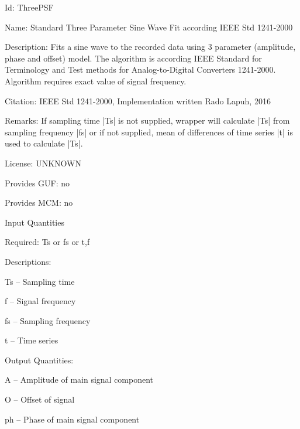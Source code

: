 \begin{tightdesc}
\item [Id:] ThreePSF
\item [Name:] Standard Three Parameter Sine Wave Fit according IEEE Std 1241-2000
\item [Description:] Fits a sine wave to the recorded data using 3 parameter (amplitude, phase and offset) model. The algorithm is according IEEE Standard for Terminology and Test methods for Analog-to-Digital Converters 1241-2000. Algorithm requires exact value of signal frequency.
\item [Citation:] IEEE Std 1241-2000, Implementation written Rado Lapuh, 2016
\item [Remarks:] If sampling time |Ts| is not supplied, wrapper will calculate |Ts| from sampling frequency |fs| or if not supplied, mean of differences of time series |t| is used to calculate |Ts|.
\item [License:] UNKNOWN
\item [Provides GUF:] no
\item [Provides MCM:] no
\item [Input Quantities] \rule{0em}{0em}
    \begin{tightdesc}
    \item [Required:] 
        \textsf{Ts} or \textsf{fs} or \textsf{t},\enspace \textsf{f}
    \item [Descriptions:] \rule{0em}{0em}
        \begin{tightdesc}
            \item[\textsf{Ts}] -- Sampling time
            \item[\textsf{f}] -- Signal frequency
            \item[\textsf{fs}] -- Sampling frequency
            \item[\textsf{t}] -- Time series
        \end{tightdesc}
    \end{tightdesc}
\item [Output Quantities:] \rule{0em}{0em}
    \begin{tightdesc}
        \item[\textsf{A}] -- Amplitude of main signal component
        \item[\textsf{O}] -- Offset of signal
        \item[\textsf{ph}] -- Phase of main signal component
    \end{tightdesc}
\end{tightdesc}
